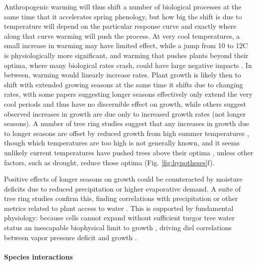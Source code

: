 \documentclass[11pt]{article}
\begin{document}
Anthropogenic warming will thus shift a number of biological processes at the same time that it accelerates spring phenology, but how big the shift is due to temperature will depend on the particular response curve and exactly where along that curve warming will push the process. At very cool temperatures, a small increase in warming may have limited effect, while a jump from 10 to 12\degree C is physiologically more significant, and warming that pushes plants beyond their optima, where many biological rates crash, could have large negative impacts \citep{nobel1983biophysical,leuning2002temperature}. In between, warming would linearly increase rates. Plant growth is likely then to shift with extended growing seasons at the same time it shifts due to changing rates, with some papers suggesting longer seasons effectively only extend the very cool periods and thus have no discernible effect on growth, while others suggest observed increases in growth are due only to increased growth rates (not longer seasons). A number of tree ring studies suggest that any increases in growth due to longer seasons are offset by reduced growth from high summer temperatures \citep{gantois2022new,dow2022warm}, though which temperatures are too high is not generally known, and it seems unlikely current temperatures have pushed trees above their optima \citep{schaber2002evaluation}, unless other factors, such as drought, reduce those optima (Fig. \ref{fig:hypotheses}f). 

Positive effects of longer seasons on growth could be counteracted by moisture deficits due to reduced precipitation or higher evaporative demand. A suite of tree ring studies confirm this, finding correlations with precipitation or other metrics related to plant access to water \citep{george2014overview,babst2019twentieth}. This is supported by fundamental physiology:
because cells cannot expand without sufficient turgor \citep{cosgrove1987wall,cosgrove2023structure} tree water status an inescapable biophysical limit to growth \citep{peters2021turgor}, driving diel correlations between vapor pressure deficit and growth \citep{babst2019twentieth,zweifel2021trees}.

\paragraph{Species interactions} %
\end{document}
